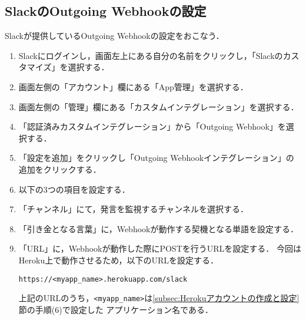 \documentclass[12pt]{jsarticle}
\begin{document}
\subsection{SlackのOutgoing Webhookの設定}\label{subsec:SlackのOutgoing Webhookの設定}
Slackが提供しているOutgoing Webhookの設定をおこなう．
\begin{enumerate}
\item Slackにログインし，画面左上にある自分の名前をクリックし，「Slackのカスタマイズ」を選択する．
\item 画面左側の「アカウント」欄にある「App管理」を選択する．
\item 画面左側の「管理」欄にある「カスタムインテグレーション」を選択する．
\item 「認証済みカスタムインテグレーション」から「Outgoing Webhook」を選択する．
\item 「設定を追加」をクリックし「Outgoing Webhookインテグレーション」の追加をクリックする．
\item 以下の3つの項目を設定する．
  \item 「チャンネル」にて，発言を監視するチャンネルを選択する．
  \item 「引き金となる言葉」に，Webhookが動作する契機となる単語を設定する．
  \item 「URL」に，Webhookが動作した際にPOSTを行うURLを設定する．
  今回はHeroku上で動作させるため，以下のURLを設定する．

{
\fontsize{9pt}{10pt}\selectfont
\begin{verbatim}
https://<myapp_name>.herokuapp.com/slack
\end{verbatim}
}
  上記のURLのうち，\verb|<myapp_name>|は\ref{subsec:Herokuアカウントの作成と設定}節の手順(6)で設定した
  アプリケーション名である．
\end{enumerate}
\end{document}
